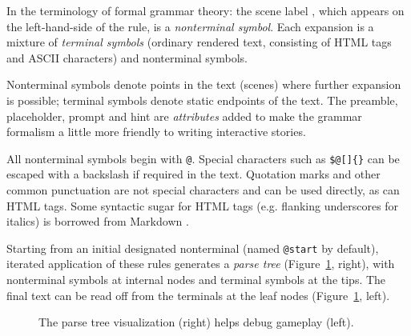 \documentclass{acm_proc_article-sp}
\begin{document}
In the terminology of formal grammar theory: the scene label {\tt \@scene}, which appears on the left-hand-side of the rule, is a {\em nonterminal symbol}.
Each expansion is a mixture of {\em terminal symbols} (ordinary rendered text, consisting of HTML tags and ASCII characters) and nonterminal symbols.

Nonterminal symbols denote points in the text (scenes) where further expansion is possible;
terminal symbols denote static endpoints of the text.
The preamble, placeholder, prompt and hint are {\em attributes}
added to make the grammar formalism a little more friendly to writing interactive stories.

All nonterminal symbols begin with {\tt @}.
Special characters such as {\tt \$@[]\{\}} can be escaped with a backslash if required in the text.
Quotation marks and other common punctuation are not special characters and can be used directly, as can HTML tags.
Some syntactic sugar for HTML tags (e.g. flanking underscores for italics) is borrowed from Markdown \cite{Markdown}.

Starting from an initial designated nonterminal (named {\tt @start} by default),
iterated application of these rules generates a {\em parse tree} (Figure~\ref{fig:tree}, right),
with nonterminal symbols at internal nodes and terminal symbols at the tips.
The final text can be read off from the terminals at the leaf nodes (Figure~\ref{fig:tree}, left).

\begin{figure}
\caption{
\label{fig:tree}
The parse tree visualization (right) helps debug gameplay (left).
}
\end{figure}
\end{document}

